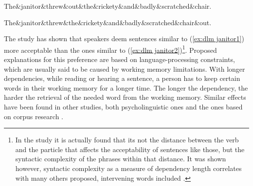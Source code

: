 \begin{exe}
    \ex
    \label{ex:dlm janitor}
    \begin{xlist}
    \ex
    \label{ex:dlm janitor1}
    \begin{dependency}[theme = simple, segmented edge, baseline=-\the\dimexpr\fontdimen22\textfont2\relax]
        \begin{deptext}
        The\&janitor\&threw\&out\&the\&rickety\&and\&badly\&scratched\&chair.\\
        \end{deptext}
    \end{dependency}

    \ex
    \label{ex:dlm janitor2}
    \begin{dependency}[theme = simple, segmented edge, edge height = 4ex, baseline=-\the\dimexpr\fontdimen22\textfont2\relax]
        \begin{deptext}
        The\&janitor\&threw\&the\&rickety\&and\&badly\&scratched\&chair\&out.\\
        \end{deptext}
    \end{dependency}
    \end{xlist}
\end{exe}

The study has shown that speakers deem sentences similar to (\ref{ex:dlm janitor1}) more acceptable than the ones similar to (\ref{ex:dlm janitor2})\footnote{In the study it is actually found that its not the distance between the verb and the particle that affects the acceptability of sentences like those, but the syntactic complexity of the phrases within that distance. It was shown however, syntactic complexity as a measure of dependency length correlates with many others proposed, intervening words included \citep{wasow2002postverbal}.}. Proposed explanations for this preference are based on language-processing constraints, which are usually said to be caused by working memory limitations. With longer dependencies, while reading or hearing a sentence, a person has to keep certain words in their working memory for a longer time. The longer the dependency, the harder the retrieval of the needed word from the working memory. Similar effects have been found in other studies, both psycholinguistic ones \citep{GIBSON19981, KING1991580} and the ones based on corpus research \citep{dyer-2023, gildea-temperley-2007-optimizing, gildea-temperley-2010}. 

